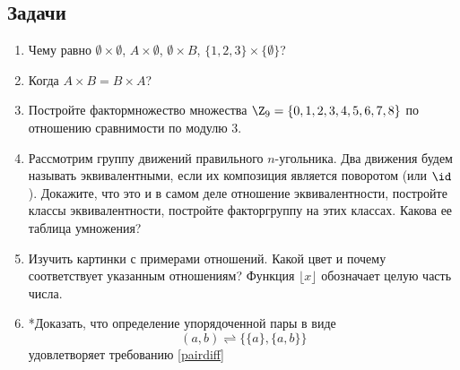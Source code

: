 \subsection*{Задачи}
\begin{enumerate}
\item Чему равно $\emptyset\times\emptyset$, $A\times\emptyset$, $\emptyset\times B$, $\{1,2,3\}\times\{\emptyset\}$?
\item Когда $A\times B = B\times A$?
\item Постройте фактормножество множества $\Z_9=\{0,1,2,3,4,5,6,7,8\}$ по отношению сравнимости по модулю $3$.
\item Рассмотрим группу движений правильного $n$-угольника. Два движения будем называть эквивалентными, если их композиция является поворотом (или $\id$). Докажите, что это и в самом деле отношение эквивалентности, постройте классы эквивалентности, постройте факторгруппу на этих классах. Какова ее таблица умножения?
\item Изучить картинки с примерами отношений. Какой цвет и почему соответствует указанным отношениям? Функция $\lfloor x\rfloor$ обозначает целую часть числа.
\item *Доказать, что определение упорядоченной пары в виде
$$
(a,b) \rightleftharpoons \{\{a\},\{a,b\}\}
$$
удовлетворяет требованию \eqref{pairdiff}
\end{enumerate}

